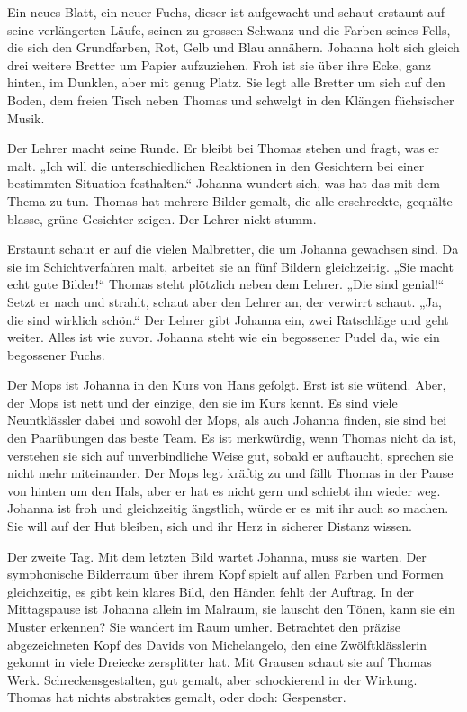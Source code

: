 \documentclass[10pt,a5paper]{book}
\begin{document}
Ein neues Blatt, ein neuer Fuchs, dieser ist aufgewacht und schaut erstaunt auf seine verlängerten Läufe, seinen zu grossen Schwanz und die Farben seines Fells, die sich den Grundfarben, Rot, Gelb und Blau annähern. Johanna holt sich gleich drei weitere Bretter um Papier aufzuziehen. Froh ist sie über ihre Ecke, ganz hinten, im Dunklen, aber mit genug Platz. Sie legt alle Bretter um sich auf den Boden, dem freien Tisch neben Thomas und schwelgt in den Klängen füchsischer Musik.

Der Lehrer macht seine Runde. Er bleibt bei Thomas stehen und fragt, was er malt. „Ich will die unterschiedlichen Reaktionen in den Gesichtern bei einer bestimmten Situation festhalten.“ Johanna wundert sich, was hat das mit dem Thema zu tun. Thomas hat mehrere Bilder gemalt, die alle erschreckte, gequälte blasse, grüne Gesichter zeigen. Der Lehrer nickt stumm. 

Erstaunt schaut er auf die vielen Malbretter, die um Johanna gewachsen sind. Da sie im Schichtverfahren malt, arbeitet sie an fünf Bildern gleichzeitig. „Sie macht echt gute Bilder!“ Thomas steht plötzlich neben dem Lehrer. „Die sind genial!“ Setzt er nach und strahlt, schaut aber den Lehrer an, der verwirrt schaut. „Ja, die sind wirklich schön.“ Der Lehrer gibt Johanna ein, zwei Ratschläge und geht weiter. Alles ist wie zuvor. Johanna steht wie ein begossener Pudel da, wie ein begossener Fuchs.

Der Mops ist Johanna in den Kurs von Hans gefolgt. Erst ist sie wütend.  Aber, der Mops ist nett und der einzige, den sie im Kurs kennt. Es sind viele Neuntklässler dabei und sowohl der Mops, als auch Johanna finden, sie sind bei den Paarübungen das beste Team. Es ist merkwürdig, wenn Thomas nicht da ist, verstehen sie sich auf unverbindliche Weise gut, sobald er auftaucht, sprechen sie nicht mehr miteinander. Der Mops legt kräftig zu und fällt Thomas in der Pause von hinten um den Hals, aber er hat es nicht gern und schiebt ihn wieder weg. Johanna ist froh und gleichzeitig ängstlich, würde er es mit ihr auch so machen. Sie will auf der Hut bleiben, sich und ihr Herz in sicherer Distanz wissen.

Der zweite Tag. Mit dem letzten Bild wartet Johanna, muss sie warten. Der symphonische Bilderraum über ihrem Kopf spielt auf allen Farben und Formen gleichzeitig, es gibt kein klares Bild, den Händen fehlt der Auftrag. In der Mittagspause ist Johanna allein im Malraum, sie lauscht den Tönen, kann sie ein Muster erkennen? Sie wandert im Raum umher. Betrachtet den präzise abgezeichneten Kopf des Davids von Michelangelo, den eine Zwölftklässlerin gekonnt in viele Dreiecke zersplitter hat. Mit Grausen schaut sie auf Thomas Werk. Schreckensgestalten, gut gemalt, aber schockierend in der Wirkung. Thomas hat nichts abstraktes gemalt, oder doch: Gespenster.
\end{document}
